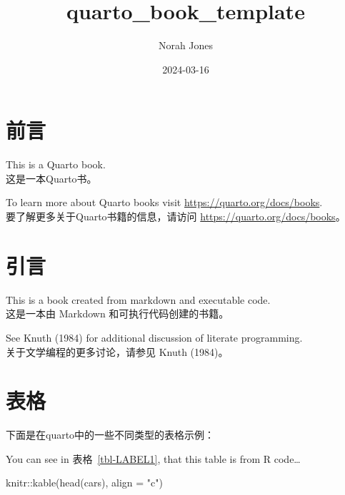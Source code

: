 \documentclass[
  1.2em,
  letterpaper,
]{scrbook}
\title{quarto\_book\_template}
\author{Norah Jones}
\date{2024-03-16}
\newenvironment{Shaded}{\begin{snugshade}}{\end{snugshade}}
\newcommand{\AttributeTok}[1]{\textcolor[rgb]{0.40,0.45,0.13}{#1}}
\newcommand{\FunctionTok}[1]{\textcolor[rgb]{0.28,0.35,0.67}{#1}}
\newcommand{\NormalTok}[1]{\textcolor[rgb]{0.00,0.23,0.31}{#1}}
\newcommand{\SpecialCharTok}[1]{\textcolor[rgb]{0.37,0.37,0.37}{#1}}
\newcommand{\StringTok}[1]{\textcolor[rgb]{0.13,0.47,0.30}{#1}}
\renewcommand*\contentsname{目录}
\newcommand\contentsname{目录}
\begin{document}
\frontmatter
\maketitle

\renewcommand*\contentsname{目录}
{
\hypersetup{linkcolor=}
\setcounter{tocdepth}{2}
\tableofcontents
}
\mainmatter
{}

\chapter*{前言}\label{ux524dux8a00}


This is a Quarto book.\\
这是一本Quarto书。

To learn more about Quarto books visit
\url{https://quarto.org/docs/books}.\\
要了解更多关于Quarto书籍的信息，请访问
\url{https://quarto.org/docs/books}。


\chapter{引言}\label{ux5f15ux8a00}

This is a book created from markdown and executable code.\\
这是一本由 Markdown 和可执行代码创建的书籍。

See Knuth (1984) for additional discussion of literate programming.\\
关于文学编程的更多讨论，请参见 Knuth (1984)。


\chapter{表格}\label{ux8868ux683c}

下面是在quarto中的一些不同类型的表格示例：

You can see in 表格~\ref{tbl-LABEL1}, that this table is from R
code\ldots{}

\begin{Shaded}
\begin{Highlighting}[]
\NormalTok{knitr}\SpecialCharTok{::}\FunctionTok{kable}\NormalTok{(}\FunctionTok{head}\NormalTok{(cars), }\AttributeTok{align =} \StringTok{"c"}\NormalTok{)}
\end{Highlighting}
\end{Shaded}
\end{document}
